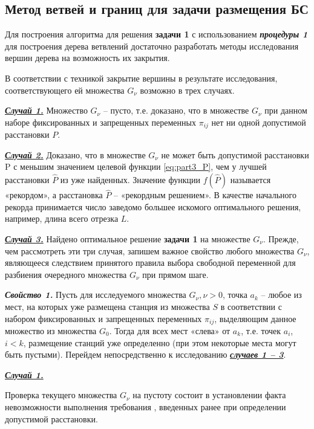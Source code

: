 \subsection{Метод ветвей и границ для задачи размещения БС} \label{BnB}
Для построения алгоритма  для решения \textbf{задачи 1} с использованием \textit{\textbf{процедуры 1}} для построения дерева ветвлений достаточно разработать методы исследования вершин дерева на возможность их закрытия.

В соответствии с техникой  закрытие вершины в результате исследования, соответствующего ей множества $G_\nu$ возможно в трех случаях.

\underline{\textit{\textbf{Случай 1.}}} Множество $G_\nu$ -- пусто, т.е. доказано, что в множестве $G_\nu$ при данном наборе фиксированных и запрещенных переменных $\pi_{ij}$ нет ни одной допустимой расстановки $P$.

\underline{\textit{\textbf{Случай 2.}}} Доказано, что в множестве $G_\nu$ не может быть допустимой расстановки P с меньшим значением целевой функции \cref{eq:part3_P}, чем у лучшей расстановки $\widehat{P}$ из уже найденных. Значение функции $f(\widehat{P})$ называется «рекордом», а расстановка $\widehat{P}$ -- «рекордным решением». В качестве начального рекорда принимается число заведомо большее искомого оптимального решения, например,  длина всего отрезка $L$.

\underline{\textit{\textbf{Случай 3.}}} Найдено оптимальное решение \textbf{задачи 1} на множестве $G_\nu$.
Прежде, чем рассмотреть эти три случая, запишем важное свойство любого множества $G_\nu$, являющееся следствием принятого правила выбора свободной переменной для разбиения очередного множества $G_\nu$ при прямом шаге. 

\textit{\textbf{Свойство 1.}} Пусть для исследуемого множества $G_\nu, \nu > 0$, точка $a_k$ -- любое из мест, на которых уже размещена станция из множества $S$ в соответствии с набором фиксированных и запрещенных переменных $\pi_{ij}$, выделяющим данное множество из множества $G_0$. Тогда для всех мест «слева» от $a_k$, т.е. точек $a_i$, $i<k$, размещение станций уже определенно (при этом некоторые места могут быть пустыми).
Перейдем непосредственно к исследованию \underline{\textit{\textbf{случаев 1 – 3}}}.

\underline{\textit{\textbf{Случай 1.}}}

Проверка текущего множества $G_\nu$ на пустоту состоит в установлении факта невозможности выполнения требования , введенных ранее при определении допустимой расстановки.

